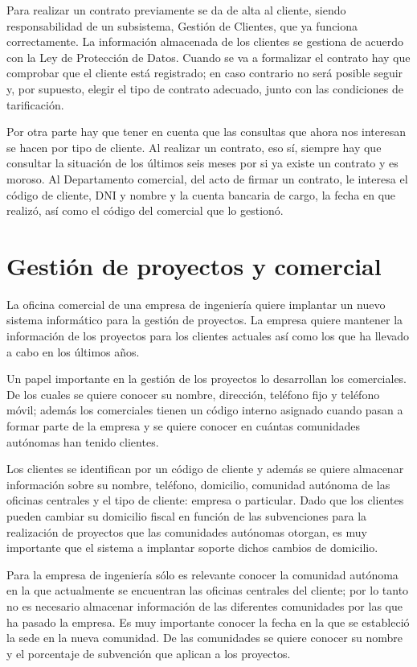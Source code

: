 \documentclass{db-practice}
\begin{document}
Para realizar un contrato previamente se da de alta al cliente, siendo responsabilidad de un subsistema, Gestión de Clientes, que ya funciona correctamente. La información almacenada de los clientes se gestiona de acuerdo con la Ley de Protección de Datos. Cuando se va a formalizar el contrato hay que comprobar que el cliente está registrado; en caso contrario no será posible seguir y, por supuesto, elegir el tipo de contrato adecuado, junto con las condiciones de tarificación. 

Por otra parte hay que tener en cuenta que las consultas que ahora nos interesan se hacen por tipo de cliente. Al realizar un contrato, eso sí, siempre hay que consultar la situación de los últimos seis meses por si ya existe un contrato y es moroso. Al Departamento comercial, del acto de firmar un contrato, le interesa el código de cliente, DNI y nombre y la cuenta bancaria de cargo, la fecha en que realizó, así como el código del comercial que lo gestionó.

\section{Gestión de proyectos y comercial}
La oficina comercial de una empresa de ingeniería quiere implantar un nuevo sistema informático para la gestión de proyectos. La empresa quiere mantener la información de  los proyectos para los clientes actuales así como los que ha llevado a cabo en los últimos años. 

Un papel importante en la gestión de los proyectos lo desarrollan los comerciales. De los cuales se quiere conocer su nombre, dirección, teléfono fijo y teléfono móvil; además los comerciales tienen un código interno asignado cuando pasan a formar parte de la empresa y se quiere conocer en cuántas comunidades autónomas han tenido clientes.

Los clientes se identifican por un código de cliente y además se quiere almacenar información sobre su nombre, teléfono, domicilio, comunidad autónoma de las oficinas centrales y el tipo de cliente: empresa o particular. Dado que los clientes pueden cambiar su domicilio fiscal en función de las subvenciones para la realización de proyectos que las comunidades autónomas otorgan, es muy importante que el sistema a implantar soporte dichos cambios de domicilio.

Para la empresa de ingeniería sólo es relevante conocer la comunidad autónoma en la que actualmente se encuentran las oficinas centrales del cliente; por lo tanto no es necesario almacenar información de las diferentes comunidades por las que ha pasado la empresa. Es muy importante conocer la fecha en la que se estableció la sede en la nueva comunidad. De las comunidades se quiere conocer su nombre y el porcentaje de subvención que aplican a los proyectos.
\end{document}
